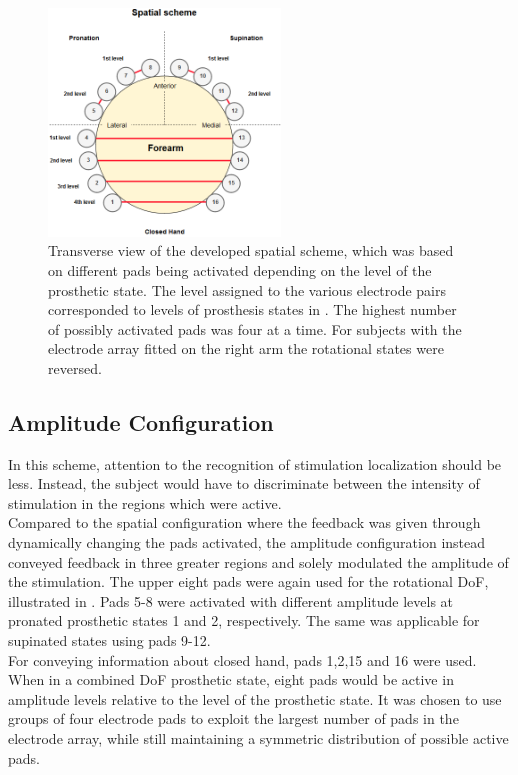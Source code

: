 \begin{figure}[H]                 
	\includegraphics[width=0.55\textwidth]{figures/El_array_spatial}  
	\caption{Transverse view of the developed spatial scheme, which was based on different pads being activated depending on the level of the prosthetic state. The level assigned to the various electrode pairs corresponded to levels of prosthesis states in . The highest number of possibly activated pads was four at a time. For subjects with the electrode array fitted on the right arm the rotational states were reversed.}
	\label{fig:spatial} 
\end{figure}


\subsection{Amplitude Configuration}

In this scheme, attention to the recognition of stimulation localization should be less. Instead, the subject would have to discriminate between the intensity of stimulation in the regions which were active. \\
Compared to the spatial configuration where the feedback was given through dynamically changing the pads activated, the amplitude configuration instead conveyed feedback in three greater regions and solely modulated the amplitude of the stimulation. The upper eight pads were again used for the rotational DoF, illustrated in . Pads 5-8 were activated with different amplitude levels at pronated prosthetic states 1 and 2, respectively. The same was applicable for supinated states using pads 9-12. \\
For conveying information about closed hand, pads 1,2,15 and 16 were used. When in a combined DoF prosthetic state, eight pads would be active in amplitude levels relative to the level of the prosthetic state. It was chosen to use groups of four electrode pads to exploit the largest number of pads in the electrode array, while still maintaining a symmetric distribution of possible active pads.

